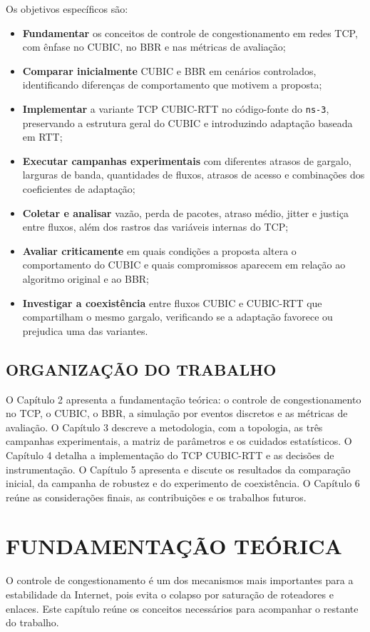 \documentclass[a4paper,12pt]{monografia}
\begin{document}
Os objetivos específicos são:
\begin{itemize}
    \item \textbf{Fundamentar} os conceitos de controle de congestionamento em redes TCP, com ênfase no CUBIC, no BBR e nas métricas de avaliação;
    \item \textbf{Comparar inicialmente} CUBIC e BBR em cenários controlados, identificando diferenças de comportamento que motivem a proposta;
    \item \textbf{Implementar} a variante TCP CUBIC-RTT no código-fonte do \texttt{ns-3}, preservando a estrutura geral do CUBIC e introduzindo adaptação baseada em RTT;
    \item \textbf{Executar campanhas experimentais} com diferentes atrasos de gargalo, larguras de banda, quantidades de fluxos, atrasos de acesso e combinações dos coeficientes de adaptação;
    \item \textbf{Coletar e analisar} vazão, perda de pacotes, atraso médio, jitter e justiça entre fluxos, além dos rastros das variáveis internas do TCP;
    \item \textbf{Avaliar criticamente} em quais condições a proposta altera o comportamento do CUBIC e quais compromissos aparecem em relação ao algoritmo original e ao BBR;
    \item \textbf{Investigar a coexistência} entre fluxos CUBIC e CUBIC-RTT que compartilham o mesmo gargalo, verificando se a adaptação favorece ou prejudica uma das variantes.
\end{itemize}

\subsection{ORGANIZAÇÃO DO TRABALHO}
O Capítulo 2 apresenta a fundamentação teórica: o controle de congestionamento no TCP, o CUBIC, o BBR, a simulação por eventos discretos e as métricas de avaliação. O Capítulo 3 descreve a metodologia, com a topologia, as três campanhas experimentais, a matriz de parâmetros e os cuidados estatísticos. O Capítulo 4 detalha a implementação do TCP CUBIC-RTT e as decisões de instrumentação. O Capítulo 5 apresenta e discute os resultados da comparação inicial, da campanha de robustez e do experimento de coexistência. O Capítulo 6 reúne as considerações finais, as contribuições e os trabalhos futuros.

\section{FUNDAMENTAÇÃO TEÓRICA}
O controle de congestionamento é um dos mecanismos mais importantes para a estabilidade da Internet, pois evita o colapso por saturação de roteadores e enlaces. Este capítulo reúne os conceitos necessários para acompanhar o restante do trabalho.
\end{document}
